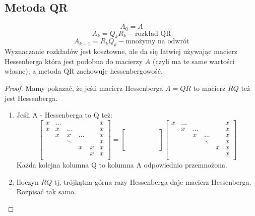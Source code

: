 \documentclass{article}
\begin{document}
\subsection{Metoda QR}
$$A_0=A$$
$$A_k=Q_kR_k - \text{rozkład QR}$$
$$A_{k+1}=R_kQ_k - \text{mnożymy na odwrót}$$
Wyznaczanie rozkładów jest kosztowne, ale da się łatwiej używając macierz Hessenberga która jest podobna do macierzy $ A $ (czyli ma te same wartości własne), a metoda QR zachowuje hessenbergowość.
\begin{proof}
	Mamy pokazać, że jeśli macierz Hessenberga $ A =QR$  to macierz $ RQ $ też jest Hessenberga.
	\begin{enumerate}
		\item Jeśli A - Hessenberga to Q też:
		$$\begin{bmatrix}
		x&\ldots&&&&x\\
		x&x&\ldots&&&x\\
		&x&x&\ldots&&x\\
		&&\ddots&&&x\\
		&&&x&x&x\\
		&&&&x&x\\
		\end{bmatrix}=\begin{bmatrix}
			&&&&&\\ \\ \\ \\ \\ \\
		\end{bmatrix}\begin{bmatrix}
		x&\ldots&&&&x\\
		&x&\ldots&&&x\\
		&&x&\ldots&&x\\
		&&&\ddots&&x\\
		&&&&x&x\\
		&&&&&x\\
		\end{bmatrix}$$
		Każda kolejna kolumna Q to kolumna A odpowiednio przemnożona.
		\item Iloczyn $ RQ $ tj, trójkątna górna razy Hessenberga daje macierz Hessenberga. Rozpisać tak samo.
	
	\end{enumerate}
\end{proof} 
\end{document}
